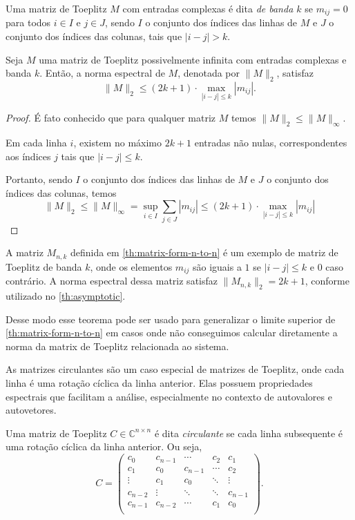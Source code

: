 \begin{definition*}
  Uma matriz de Toeplitz $ M $ com entradas complexas é dita \textit{de banda $ k $} se $ m_{ij} = 0 $ para todos $ i \in I$ e $j \in J $, sendo $I$ o conjunto dos índices das linhas de $M$ e $J$ o conjunto dos índices das colunas, tais que $ |i - j| > k $.
\end{definition*}

\begin{theorem*} Seja \( M \) uma matriz de Toeplitz possivelmente infinita com entradas complexas e banda \( k \). Então, a norma espectral de \( M \), denotada por \( \| M \|_2 \), satisfaz \[ \| M \|_2 \leq (2k + 1) \cdot \max_{|i - j| \leq k} |m_{ij}|. \] \end{theorem*}
\begin{proof}
É fato conhecido que para qualquer matriz $M$ temos $\| M \|_2 \leq \| M \|_\infty$.

Em cada linha $i$, existem no máximo $2k + 1$ entradas não nulas, correspondentes aos índices $j$ tais que $\lvert i - j \rvert \leq k$.

Portanto, sendo $I$ o conjunto dos índices das linhas de $M$ e $J$ o conjunto dos índices das colunas, temos \[ \| M \|_2 \le \| M \|_\infty = \sup_{i \in I} \sum_{j \in J} |m_{ij}| \leq (2k + 1) \cdot \max_{|i - j| \leq k} |m_{ij}| \]
\end{proof}

A matriz $ M_{n,k} $ definida em \ref{th:matrix-form-n-to-n} é um exemplo de matriz de Toeplitz de banda $ k $, onde os elementos $ m_{ij} $ são iguais a $ 1 $ se $ |i - j| \le k $ e $ 0 $ caso contrário. A norma espectral dessa matriz satisfaz $ \| M_{n,k} \|_2 = 2k + 1 $, conforme utilizado no \ref{th:asymptotic}.

Desse modo esse teorema pode ser usado para generalizar o limite superior de \ref{th:matrix-form-n-to-n} em casos onde não conseguimos calcular diretamente a norma da matrix de Toeplitz relacionada ao sistema.

As matrizes circulantes são um caso especial de matrizes de Toeplitz, onde cada linha é uma rotação cíclica da linha anterior. Elas possuem propriedades espectrais que facilitam a análise, especialmente no contexto de autovalores e autovetores.

\begin{definition*}
  Uma matriz de Toeplitz $ C \in \mathbb{C}^{n \times n} $ é dita \textit{circulante} se cada linha subsequente é uma rotação cíclica da linha anterior. Ou seja,
  \[
    C = \begin{pmatrix}
      c_0     & c_{n-1} & \cdots  & c_2    & c_1     \\
      c_1     & c_0     & c_{n-1} & \cdots & c_2     \\
      \vdots  & c_1     & c_0     & \ddots & \vdots  \\
      c_{n-2} & \vdots  & \ddots  & \ddots & c_{n-1} \\
      c_{n-1} & c_{n-2} & \cdots  & c_1    & c_0     \\
    \end{pmatrix}.
  \]
\end{definition*}

